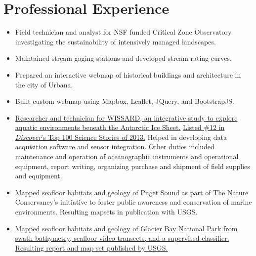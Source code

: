 \section{Professional Experience}

\begin{itemize}
\item Field technician and analyst for NSF funded Critical Zone Observatory investigating the sustainability of intensively managed landscapes. 
\item Maintained stream gaging stations and developed stream rating curves. 
\end{itemize}

\begin{itemize}
\item Prepared an interactive webmap of historical buildings and architecture in the city of Urbana.
\item Built custom webmap using Mapbox, Leaflet, JQuery, and BootstrapJS. 

\end{itemize}

\begin{itemize}
\item \href{http://www.wissard.org}{Researcher and technician for WISSARD, an
  integrative study to explore aquatic environments beneath the Antarctic Ice
  Sheet.}
  \href{http://discovermagazine.com/2014/jan-feb/12-the-search-for-life-trapped-under-ice}
       {Listed \#12 in \textit{Discover}'s Top 100 Science Stories of 2013.} Helped in developing data acquisition software and sensor integration.
       Other duties included maintenance and operation of oceanographic instruments and operational equipment,
       report writing, organizing purchase and shipment of field supplies and equipment.
  
\item Mapped seafloor habitats and geology of Puget Sound as part of The Nature
  Conservancy's initiative to foster public awareness and conservation of marine
  environments. Resulting mapsets in publication with USGS.

\item \href{http://pubs.usgs.gov/sim/3253/}{Mapped seafloor habitats and geology
  of Glacier Bay National Park from swath bathymetry, seafloor video transects, and a supervised classifier. Resulting report and map set published by USGS.}
  
\end{itemize}

